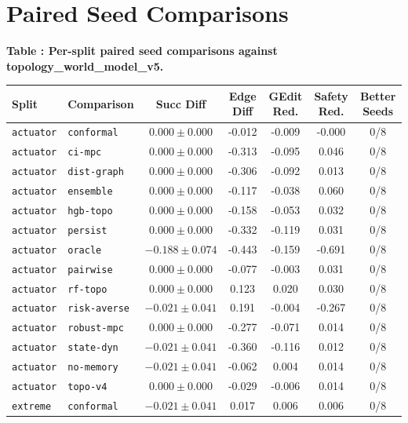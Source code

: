 \documentclass{article}
\begin{document}
\normalsize

\section{Paired Seed Comparisons}
\tiny
\begin{center}
\label{tab:pairwise}\textbf{Table \thetable: Per-split paired seed comparisons against topology\_world\_model\_v5.}\\[0.4ex]
\begin{tabular}{llccccc}
\toprule
Split & Comparison & Succ Diff & Edge Diff & GEdit Red. & Safety Red. & Better Seeds \\
\midrule
\texttt{actuator} & \texttt{conformal} & $0.000 \pm 0.000$ & -0.012 & -0.009 & -0.000 & 0/8 \\
\texttt{actuator} & \texttt{ci-mpc} & $0.000 \pm 0.000$ & -0.313 & -0.095 & 0.046 & 0/8 \\
\texttt{actuator} & \texttt{dist-graph} & $0.000 \pm 0.000$ & -0.306 & -0.092 & 0.013 & 0/8 \\
\texttt{actuator} & \texttt{ensemble} & $0.000 \pm 0.000$ & -0.117 & -0.038 & 0.060 & 0/8 \\
\texttt{actuator} & \texttt{hgb-topo} & $0.000 \pm 0.000$ & -0.158 & -0.053 & 0.032 & 0/8 \\
\texttt{actuator} & \texttt{persist} & $0.000 \pm 0.000$ & -0.332 & -0.119 & 0.031 & 0/8 \\
\texttt{actuator} & \texttt{oracle} & $-0.188 \pm 0.074$ & -0.443 & -0.159 & -0.691 & 0/8 \\
\texttt{actuator} & \texttt{pairwise} & $0.000 \pm 0.000$ & -0.077 & -0.003 & 0.031 & 0/8 \\
\texttt{actuator} & \texttt{rf-topo} & $0.000 \pm 0.000$ & 0.123 & 0.020 & 0.030 & 0/8 \\
\texttt{actuator} & \texttt{risk-averse} & $-0.021 \pm 0.041$ & 0.191 & -0.004 & -0.267 & 0/8 \\
\texttt{actuator} & \texttt{robust-mpc} & $0.000 \pm 0.000$ & -0.277 & -0.071 & 0.014 & 0/8 \\
\texttt{actuator} & \texttt{state-dyn} & $-0.021 \pm 0.041$ & -0.360 & -0.116 & 0.012 & 0/8 \\
\texttt{actuator} & \texttt{no-memory} & $-0.021 \pm 0.041$ & -0.062 & 0.004 & 0.014 & 0/8 \\
\texttt{actuator} & \texttt{topo-v4} & $0.000 \pm 0.000$ & -0.029 & -0.006 & 0.014 & 0/8 \\
\texttt{extreme} & \texttt{conformal} & $-0.021 \pm 0.041$ & 0.017 & 0.006 & 0.006 & 0/8 \\

\end{tabular}
\end{center}
\end{document}
